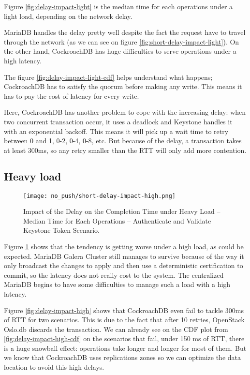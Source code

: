 Figure \ref{fig:delay-impact-light} is the median time for each operations under a light load, depending on the network delay.

MariaDB handles the delay pretty well despite the fact the request have to travel through the network (as we can see on figure \ref{fig:short-delay-impact-light}). On the other hand, CockroachDB has huge difficulties to serve operations under a high latency.


The figure \ref{fig:delay-impact-light-cdf} helps understand what happens; CockroachDB has to satisfy the quorum before making any write. This means it has to pay the cost of latency for every write.

Here, CockroachDB has another problem to cope with the increasing delay: when two concurrent transaction occur, it uses a deadlock and Keystone handles it with an exponential backoff. This means it will pick up a wait time to retry between 0 and 1, 0-2, 0-4, 0-8, etc. But because of the delay, a transaction takes at least 300ms, so any retry smaller than the RTT will only add more contention.

\subsection{Heavy load}

\begin{figure}[H]
  \vspace{-10pt}
  \centering
  \centerline{\texttt{[image: no\_push/short-delay-impact-high.png]}}
  \vspace{-5pt}
  \caption{Impact of the Delay on the Completion Time under Heavy Load – Median Time for Each Operations – Authenticate and Validate Keystone Token Scenario.}
  \vspace{-5pt}
  \label{fig:short-delay-impact-high}
\end{figure}

Figure \ref{fig:short-delay-impact-high} shows that the tendency is getting worse under a high load, as could be expected. MariaDB Galera Cluster still manages to survive because of the way it only broadcast the changes to apply and then use a deterministic certification to commit, so the latency does not really cost to the system. The centralized MariaDB begins to have some difficulties to manage such a load with a high latency.

Figure \ref{fig:delay-impact-high} shows that CockroachDB even fail to tackle 300ms of RTT for two scenarios. This is due to the fact that after 10 retries, OpenStack Oslo.db discards the transaction. We can already see on the CDF plot from \ref{fig:delay-impact-high-cdf} on the scenarios that fail, under 150 ms of RTT, there is a huge snowball effect: operations take longer and longer for most of them. But we know that CockroachDB uses replications zones so we can optimize the data location to avoid this high delays.

